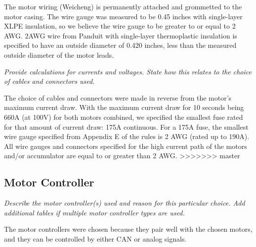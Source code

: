 \documentclass{article}
\begin{document}
    The motor wiring (Weicheng) is permanently attached and grommetted to the motor casing. The wire gauge was measured to be 0.45 inches with single-layer XLPE insulation, so we believe the wire gauge to be greater to or equal to 2 AWG. 2AWG wire from Panduit with single-layer thermoplastic insulation is specified to have an outside diameter of 0.420 inches, less than the measured outside diameter of the motor leads.

    \textit{Provide calculations for currents and voltages. State how this relates to the choice of cables and connectors used.}

    The choice of cables and connectors were made in reverse from the motor's maximum current draw. With the maximum current draw for 10 seconds being 660A (at 100V) for both motors combined, we specified the smallest fuse rated for that amount of current draw: 175A continuous. For a 175A fuse, the smallest wire gauge specified from Appendix E of the rules is 2 AWG (rated up to 190A). All wire gauges and connectors specified for the high current path of the motors and/or accumulator are equal to or greater than 2 AWG.
>>>>>>> master

    \subsection{Motor Controller}

    \textit{Describe the motor controller(s) used and reason for this particular choice. Add additional tables if multiple motor controller types are used.}

    The motor controllers were chosen because they pair well with the chosen motors, and they can be controlled by either CAN or analog signals.
\end{document}
